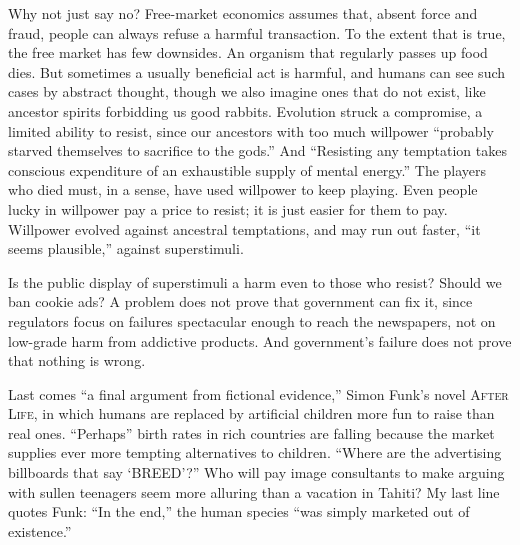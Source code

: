 Why not just say no? Free-market economics assumes that, absent force and fraud, people can always refuse a harmful transaction. To the extent that is true, the free market has few downsides. An organism that regularly passes up food dies. But sometimes a usually beneficial act is harmful, and humans can see such cases by abstract thought, though we also imagine ones that do not exist, like ancestor spirits forbidding us good rabbits. Evolution struck a compromise, a limited ability to resist, since our ancestors with too much willpower ``probably starved themselves to sacrifice to the gods.'' And ``Resisting any temptation takes conscious expenditure of an exhaustible supply of mental energy.''  The players who died must, in a sense, have used willpower to keep playing. Even people lucky in willpower pay a price to resist; it is just easier for them to pay. Willpower evolved against ancestral temptations, and may run out faster, ``it seems plausible,'' against superstimuli.

Is the public display of superstimuli a harm even to those who resist? Should we ban cookie ads? A problem does not prove that government can fix it, since regulators focus on failures spectacular enough to reach the newspapers, not on low-grade harm from addictive products. And government's failure does not prove that nothing is wrong.

Last comes ``a final argument from fictional evidence,'' Simon Funk's novel \textsc{After Life}, in which humans are replaced by artificial children more fun to raise than real ones. ``Perhaps'' birth rates in rich countries are falling because the market supplies ever more tempting alternatives to children. ``Where are the advertising billboards that say `BREED'?'' Who will pay image consultants to make arguing with sullen teenagers seem more alluring than a vacation in Tahiti? My last line quotes Funk: ``In the end,'' the human species ``was simply marketed out of existence.'' 
